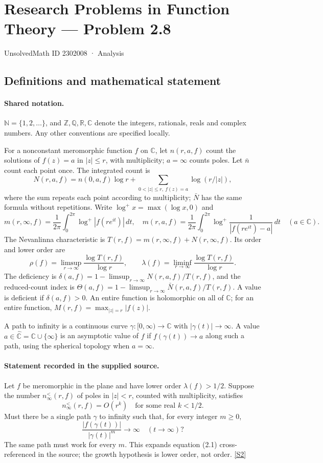 \documentclass[11pt]{article}
\newcommand{\sref}[2]{\hyperlink{source:#1:#2}{[S#2]}}
\begin{document}
\setcounter{section}{2302007}
\section{Research Problems in Function Theory — Problem 2.8}\label{2302008}
{\small\sffamily UnsolvedMath ID 2302008 · Analysis}
\subsection{Definitions and mathematical statement}

\paragraph{Shared notation.}$\mathbb N=\{1,2,\ldots\}$, and $\mathbb Z,\mathbb Q,\mathbb R,\mathbb C$ denote the integers, rationals, reals and complex numbers. Any other conventions are specified locally.


For a nonconstant meromorphic function $f$ on $\mathbb C$, let $n(r,a,f)$ count the solutions of $f(z)=a$ in $|z|\le r$, with multiplicity; $a=\infty$ counts poles. Let $\bar n$ count each point once. The integrated count is
\[
 N(r,a,f)=n(0,a,f)\log r+\sum_{0<|z|\le r,\ f(z)=a}\log(r/|z|),
\]
where the sum repeats each point according to multiplicity; $\bar N$ has the same formula without repetitions. Write $\log^+x=\max(\log x,0)$ and
\[
 m(r,\infty,f)=\frac1{2\pi}\int_0^{2\pi}\log^+|f(re^{it})|\,dt,\quad
 m(r,a,f)=\frac1{2\pi}\int_0^{2\pi}\log^+\frac1{|f(re^{it})-a|}\,dt\quad(a\in\mathbb C).
\]
The Nevanlinna characteristic is $T(r,f)=m(r,\infty,f)+N(r,\infty,f)$. Its order and lower order are
\[
 \rho(f)=\limsup_{r\to\infty}\frac{\log T(r,f)}{\log r},\qquad
 \lambda(f)=\liminf_{r\to\infty}\frac{\log T(r,f)}{\log r}.
\]
The deficiency is $\delta(a,f)=1-\limsup_{r\to\infty}N(r,a,f)/T(r,f)$, and the reduced-count index is $\Theta(a,f)=1-\limsup_{r\to\infty}\bar N(r,a,f)/T(r,f)$. A value is deficient if $\delta(a,f)>0$. An entire function is holomorphic on all of $\mathbb C$; for an entire function, $M(r,f)=\max_{|z|=r}|f(z)|$.

A path to infinity is a continuous curve $\gamma:[0,\infty)\to\mathbb C$ with $|\gamma(t)|\to\infty$. A value $a\in\widehat{\mathbb C}=\mathbb C\cup\{\infty\}$ is an asymptotic value of $f$ if $f(\gamma(t))\to a$ along such a path, using the spherical topology when $a=\infty$.
\paragraph{Statement recorded in the supplied source.}
Let $f$ be meromorphic in the plane and have lower order $\lambda(f)>1/2$. Suppose the number $n_\infty^{<}(r,f)$ of poles in $|z|<r$, counted with multiplicity, satisfies
\[
 n_\infty^{<}(r,f)=O(r^k)\quad\text{for some real }k<1/2.
\]
Must there be a single path $\gamma$ to infinity such that, for every integer $m\ge0$,
\[
 \frac{|f(\gamma(t))|}{|\gamma(t)|^m}\longrightarrow\infty\quad(t\to\infty)?
\]
The same path must work for every $m$. This expands equation (2.1) cross-referenced in the source; the growth hypothesis is lower order, not order. \sref{2302008}{2}
\end{document}
